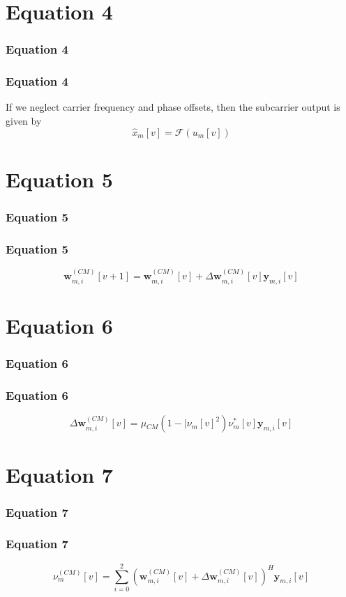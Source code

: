\documentclass{beamer}
\theoremstyle{remark}
\let\vec\mathbf
\begin{document}
\section{Equation 4}
\begin{frame}
\frametitle{Equation 4}
\frametitle{Equation 4}
 If we neglect carrier frequency and phase offsets, then the
subcarrier output is given by
  \begin{equation*}
 \hat{x}_m[v] ={\mathcal{F}}(u_m[v])
  \end{equation*}
 \end{frame}
 
 \section{Equation 5}
\begin{frame}
\frametitle{Equation 5}
\frametitle{Equation 5}
 \begin{equation*}
\vec{w}^{(CM)}_{m,i}[v+1] = \vec{w}^{(CM)}_{m,i}[v] + \Delta{\vec{w}^{(CM)}_{m,i}[v]}\vec{y}_{m,i}[v]
 \end{equation*}



  \end{frame}
  
   \section{Equation 6}
\begin{frame}
\frametitle{Equation 6}
\frametitle{Equation 6}
 \begin{equation*}
\Delta{\vec{w}^{(CM)}_{m,i}[v]} = \mu{_{CM}}(1 - \mid{{\nu_m[v]}^2}){\nu^*_m[v]}\vec{y}_{m,i}[v]
\end{equation*}

  \end{frame}
  
   \section{Equation 7}
\begin{frame}
\frametitle{Equation 7}
\frametitle{Equation 7}
 \begin{equation*}
{\nu^{(CM)}_m[v]} = \sum_{i=0}^{2} (\vec{w}^{(CM)}_{m,i}[v] + \Delta{\vec{w}^{(CM)}_{m,i}[v]})^{H}\vec{y}_{m,i}[v]
\end{equation*}
  \end{frame}
  
\end{document}
